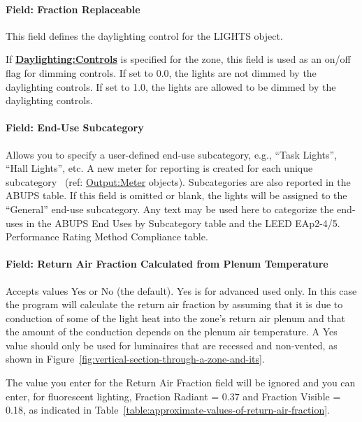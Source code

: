 \paragraph{Field: Fraction Replaceable}\label{field-fraction-replaceable}

This field defines the daylighting control for the LIGHTS object.

If \textbf{\hyperref[daylightingcontrols-000]{Daylighting:Controls}} is specified for the zone, this field is used as an on/off flag for dimming controls. If set to 0.0, the lights are not dimmed by the daylighting controls. If set to 1.0, the lights are allowed to be dimmed by the daylighting controls.

\paragraph{Field: End-Use Subcategory}\label{field-end-use-subcategory-002}

Allows you to specify a user-defined end-use subcategory, e.g., ``Task Lights'', ``Hall Lights'', etc. A new meter for reporting is created for each unique subcategory~ (ref: \hyperref[outputmeter-and-outputmetermeterfileonly]{Output:Meter} objects). Subcategories are also reported in the ABUPS table. If this field is omitted or blank, the lights will be assigned to the ``General'' end-use subcategory. Any text may be used here to categorize the end-uses in the ABUPS End Uses by Subcategory table and the LEED EAp2-4/5. Performance Rating Method Compliance table.

\paragraph{Field: Return Air Fraction Calculated from Plenum Temperature}\label{field-return-air-fraction-calculated-from-plenum-temperature}

Accepts values Yes or No (the default). Yes is for advanced used only. In this case the program will calculate the return air fraction by assuming that it is due to conduction of some of the light heat into the zone's return air plenum and that the amount of the conduction depends on the plenum air temperature. A Yes value should only be used for luminaires that are recessed and non-vented, as shown in Figure~\ref{fig:vertical-section-through-a-zone-and-its}.

The value you enter for the Return Air Fraction field will be ignored and you can enter, for fluorescent lighting, Fraction Radiant = 0.37 and Fraction Visible = 0.18, as indicated in Table~\ref{table:approximate-values-of-return-air-fraction}.

